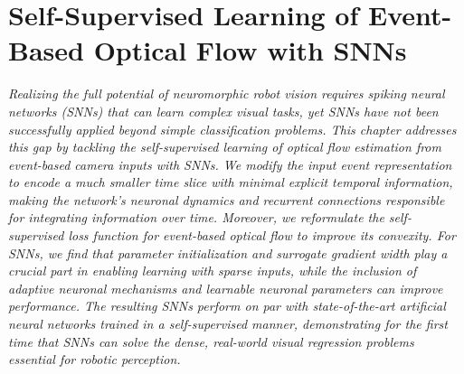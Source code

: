 \chapter{Self-Supervised Learning of Event-Based Optical Flow with SNNs}
\label{ch:neurips}

{\it
Realizing the full potential of neuromorphic robot vision requires spiking neural networks (SNNs) that can learn complex visual tasks, yet SNNs have not been successfully applied beyond simple classification problems. This chapter addresses this gap by tackling the self-supervised learning of optical flow estimation from event-based camera inputs with SNNs. We modify the input event representation to encode a much smaller time slice with minimal explicit temporal information, making the network's neuronal dynamics and recurrent connections responsible for integrating information over time. Moreover, we reformulate the self-supervised loss function for event-based optical flow to improve its convexity. For SNNs, we find that parameter initialization and surrogate gradient width play a crucial part in enabling learning with sparse inputs, while the inclusion of adaptive neuronal mechanisms and learnable neuronal parameters can improve performance. The resulting SNNs perform on par with state-of-the-art artificial neural networks trained in a self-supervised manner, demonstrating for the first time that SNNs can solve the dense, real-world visual regression problems essential for robotic perception.
}


